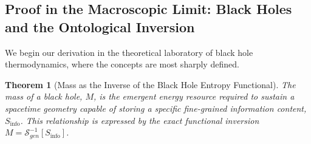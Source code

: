 \documentclass[11pt, letterpaper]{report}
\theoremstyle{plain} %
\newtheorem{theorem}{Theorem}[chapter]
\theoremstyle{definition} %
\theoremstyle{remark} %
\begin{document}
\subsection{Proof in the Macroscopic Limit: Black Holes and the Ontological Inversion}
\label{subsec:mass_info_black_holes}

We begin our derivation in the theoretical laboratory of black hole thermodynamics, where the concepts are most sharply defined.

\begin{theorem}[Mass as the Inverse of the Black Hole Entropy Functional]
\label{thm:mass_is_inverse_entropy}
The mass of a black hole, $M$, is the emergent energy resource required to sustain a spacetime geometry capable of storing a specific fine-grained information content, $S_{\text{info}}$. This relationship is expressed by the exact functional inversion $M = \mathcal{S}_{gen}^{-1}[S_{\text{info}}]$.
\end{theorem}
\end{document}
